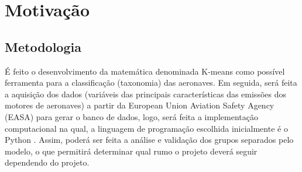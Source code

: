 \documentclass[12pt]{article} %
\begin{document}
	\newpage
	\chapter{Motivação}
		
		\pagestyle{fancy}
		\thispagestyle{empty}
		\section{Metodologia}
		
			É feito o desenvolvimento da matemática denominada K-means como possível ferramenta para a classificação (taxonomia) das aeronaves. Em seguida, será feita a aquisição dos dados (variáveis das principais características das emissões dos motores de aeronaves) a partir da European Union Aviation Safety Agency (EASA) para gerar o banco de dados, logo, será feita a implementação computacional na qual, a linguagem de programação escolhida inicialmente é o Python \cite{Kiusalaas2010}. Assim, poderá ser feita a análise e validação dos grupos separados pelo modelo, o que permitirá determinar qual rumo o projeto deverá seguir dependendo do projeto.
\end{document}
